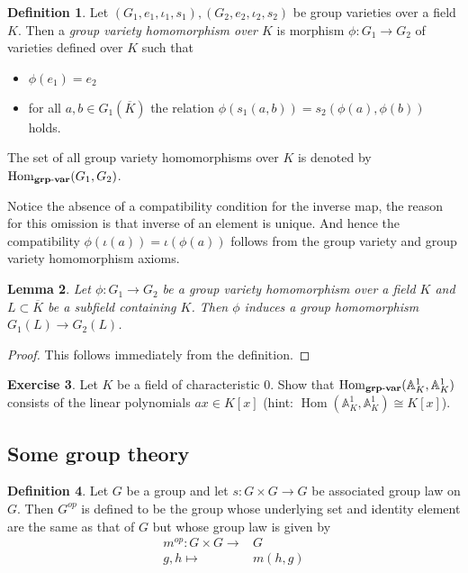 \documentclass[a4paper,12pt,reqno]{amsart}
\newcommand{\field}[1]{\mathbb{#1}}  %
\newcommand{\A}{\field{A}}
\newcommand{\HomGrpVar}{\mathrm{Hom}_{\bf grp\text{-}var}}
\DeclareMathOperator{\Hom}{Hom}
\newtheorem{lemma}{Lemma}
\theoremstyle{definition}
\newtheorem{definition}[lemma]{Definition}
\newtheorem{exercise}[lemma]{Exercise}
\numberwithin{lemma}{section}
\numberwithin{equation}{section}
\numberwithin{figure}{section}
\begin{document}
\begin{definition}\label{def:group-variety-homomorphism}
Let $(G_1,e_1,\iota_1,s_1), (G_2,e_2,\iota_2,s_2)$ be group varieties over  a field $K$. Then a \textit{group variety homomorphism over $K$} is morphism $\phi: G_1 \to G_2$ of varieties defined over $K$ such that
\begin{itemize}
	\item $\phi(e_1)=e_2$
	\item for all $a,b \in G_1(\overline K)$ the relation $\phi(s_1(a,b)) = s_2(\phi(a),\phi(b))$ holds.
\end{itemize}
The set of all group variety homomorphisms over $K$ is denoted by $\HomGrpVar(G_1,G_2)$.
\end{definition}
Notice the absence of a compatibility condition for the inverse map, the reason for this omission is that inverse of an element is unique. And hence the compatibility $\phi(\iota(a))=\iota(\phi(a))$ follows from the group variety and group variety homomorphism axioms.

\begin{lemma}\label{stmt:group-homomorphism-from-group-variety-homomorphism}
	Let $\phi: G_1 \to G_2$ be a group variety homomorphism over a field $K$ and $L\subset \overline K$ be a subfield containing $K$. Then $\phi$ induces a group homomorphism  $G_1(L) \to G_2(L)$.
\end{lemma}
\begin{proof}
	This follows immediately from the definition.
\end{proof}

\begin{exercise}
Let $K$ be a field of characteristic $0$. Show that $\HomGrpVar(\A^1_K, \A^1_K)$ consists of the linear polynomials $ax \in K[x]$ (hint: $\Hom(\A^1_K, \A^1_K) \cong K[x]$). 
\end{exercise}



\subsection{Some group theory}

\begin{definition}Let $G$ be a group and let $s: G \times G \to G$ be associated group law on $G$. Then $G^{op}$ is defined to be the group whose underlying set and identity element are the same as that of $G$ but whose group law is given by \begin{align*}
	m^{op}: G \times G \to& G \\
	  g,h \mapsto& m(h,g)
	\end{align*}
\end{definition}
\end{document}
